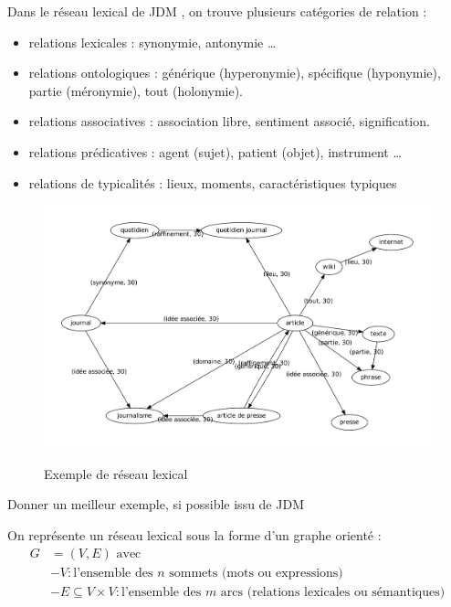 \medskip

Dans le réseau lexical de JDM \citep{lafourcade_lirmm-00507777}, on
trouve plusieurs catégories de relation :
\begin{itemize}
	\item relations lexicales : synonymie, antonymie \dots
	\item relations ontologiques : générique (hyperonymie), spécifique
		(hyponymie), partie (méronymie), tout (holonymie).
	\item relations associatives : association libre, sentiment associé,
		signification.
	\item relations prédicatives : agent (sujet), patient (objet),
		instrument \dots
	\item relations de typicalités : lieux, moments, caractéristiques typiques
\end{itemize}

\begin{figure}[!h]
	\centering
	\includegraphics[scale=0.46]{./img/rl1}
	\label{fig:exempleRL1}
	\caption{Exemple de réseau lexical}
\end{figure}

\begin{todo}
	Donner un meilleur exemple, si possible issu de JDM
\end{todo}

On représente un réseau lexical sous la forme d'un graphe orienté :
\begin{align*}
	G &= (V, E) \text{ avec} \\
	&- V : \text{l'ensemble des } n \text{ sommets (mots ou expressions)} \\
	&- E \subseteq V \times V : \text{l'ensemble des } m \text{ arcs (relations lexicales
		ou sémantiques)}
\end{align*}

